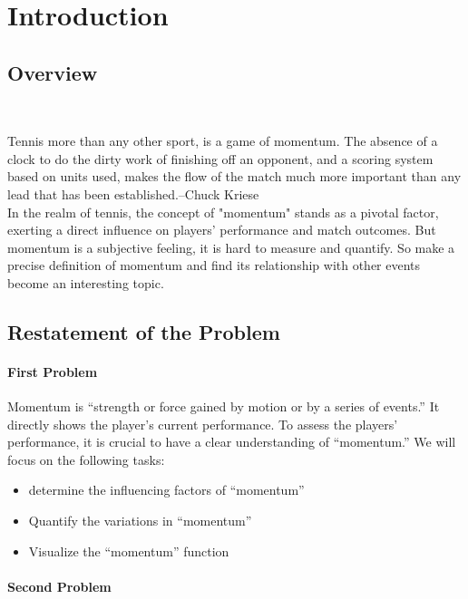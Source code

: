 \setcounter{page}{1}

\section{Introduction}

\subsection{Overview}~{}

Tennis more than any other sport, is a game of momentum. 
The absence of a clock to do the dirty work of finishing off an opponent, 
and a scoring system based on units used, makes the flow of the match much more important than any 
lead that has been established.--Chuck Kriese\\
In the realm of tennis, the concept of "momentum" stands as a pivotal factor, 
exerting a direct influence on players' performance and match outcomes. But momentum
is a subjective feeling, it is hard to measure and quantify. So make a precise definition 
of momentum and find its relationship with other events become an interesting topic.

\subsection{Restatement of the Problem}

\paragraph{First Problem}

Momentum is “strength or force gained by motion or by a series of 
events.” It directly shows the player's current performance.
To assess the players' performance, it is crucial to have a clear understanding of ``momentum.'' 
We will focus on the following tasks: 
\begin{itemize}
    \item determine the influencing factors of ``momentum''
    \item Quantify the variations in ``momentum''
    \item Visualize the ``momentum'' function
\end{itemize}

\paragraph{Second Problem}

